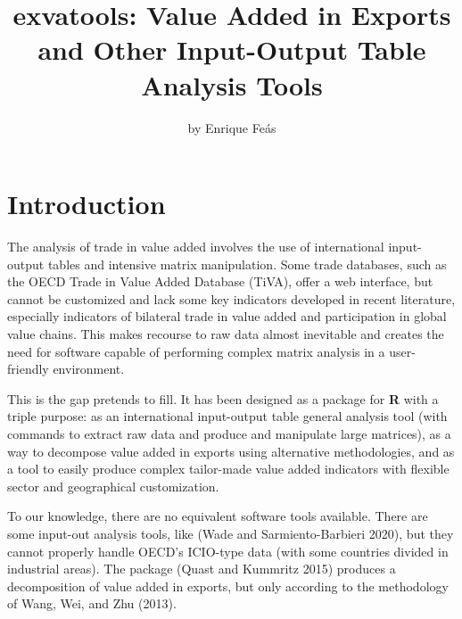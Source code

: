 \title{exvatools: Value Added in Exports and Other Input-Output Table Analysis Tools}
\author{by Enrique Feás}

\maketitle


\hypertarget{introduction}{%
\section{Introduction}\label{introduction}}

The analysis of trade in value added involves the use of international
input-output tables and intensive matrix manipulation. Some trade databases,
such as the OECD Trade in Value Added Database (TiVA), offer a web interface,
but cannot be customized and lack some key indicators developed in recent
literature, especially indicators of bilateral trade in value added and
participation in global value chains. This makes recourse to raw data almost
inevitable and creates the need for software capable of performing complex
matrix analysis in a user-friendly environment.

This is the gap  pretends to fill. It has been designed as a
package for \textbf{R} with a triple purpose: as an international input-output table
general analysis tool (with commands to extract raw data and produce and
manipulate large matrices), as a way to decompose value added in exports using
alternative methodologies, and as a tool to easily produce complex tailor-made
value added indicators with flexible sector and geographical customization.

To our knowledge, there are no equivalent software tools available. There are
some input-out analysis tools, like 
(Wade and Sarmiento-Barbieri 2020), but they cannot properly handle OECD's ICIO-type data
(with some countries divided in industrial areas). The package 
(Quast and Kummritz 2015) produces a decomposition of value added in exports, but
only according to the methodology of Wang, Wei, and Zhu (2013).

